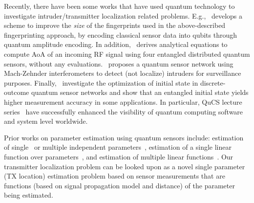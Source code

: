 Recently, there have been some works that have used quantum technology to investigate
intruder/transmitter localization related problems. E.g.,~\cite{lcn22-qloc} develops a scheme
to improve the {\em size} of the fingerprints used in the above-described 
fingerprinting approach, by encoding classical sensor data into qubits 
through quantum amplitude encoding.
In addition,~\cite{PR22-quantum_positioning} derives analytical equations to compute AoA of an
incoming RF signal using four entangled distributed quantum sensors, without any evaluations.~\cite{qsn-detection} proposes a quantum sensor network 
using Mach-Zehnder interferometers to detect (not localize) 
intruders for surveillance purposes.
Finally,~\cite{Hillery_2023,qsn-acm-23} investigate the optimization of initial state in discrete-outcome quantum sensor networks and show that an entangled initial state yields
higher measurement accuracy in some applications.
In particular, QuCS lecture series~\cite{zhiding2023} have successfully enhanced the visibility of quantum computing software and system level worldwide.

Prior works on parameter estimation using quantum sensors
include: estimation of single~\cite{Giovannetti_2011} %
or multiple independent parameters~\cite{mpe_2018}, estimation of a single linear function over parameters~\cite{Altenburg_2019}, and estimation of multiple linear functions~\cite{Rubio_2020}. Our transmitter localization problem can be looked upon
as a novel single parameter (TX location) estimation problem based on sensor measurements that are functions (based on signal propagation model and distance) of the parameter being estimated.
